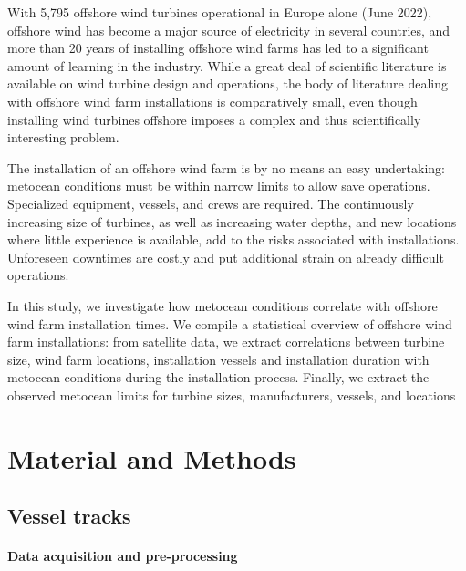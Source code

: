 \documentclass[wes, manuscript]{copernicus}
\begin{document}


\introduction  %

With 5,795 offshore wind turbines operational in Europe alone (June 2022),
offshore wind has become a major source of electricity in several countries, 
and more than 20 years of installing offshore wind farms has led to a significant
amount of learning in the industry. While a great deal of scientific 
literature is available on wind turbine design and operations, the body of 
literature dealing with offshore wind farm installations is 
comparatively small, even though installing wind turbines offshore imposes a
complex and thus scientifically interesting problem.

The installation of an offshore wind farm is by no means an easy undertaking: 
metocean conditions must be within narrow limits to allow save operations. 
Specialized equipment, vessels, and crews are required. The continuously 
increasing size of turbines, as well as increasing water depths, and new locations 
where little experience is available, add to the risks associated with installations. 
Unforeseen downtimes are costly and put additional strain on already difficult operations. 

In this study, we investigate how metocean conditions correlate with offshore wind farm 
installation times. We compile a statistical overview of offshore wind farm installations: 
from satellite data, we extract correlations between turbine size, wind farm locations, 
installation vessels and installation duration with metocean conditions during the installation process. Finally, we extract the observed metocean limits for turbine sizes, manufacturers, vessels, and locations

\section{Material and Methods}

\subsection{Vessel tracks}



\paragraph{Data acquisition and pre-processing}
\end{document}
